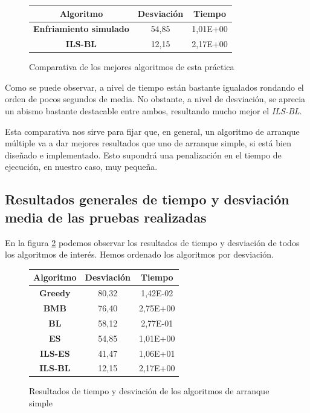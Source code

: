\begin{figure}[H]
    \centering
    \begin{tabular}{|c|c|c|}
        \hline
        Algoritmo & \textbf{Desviación} & \textbf{Tiempo}\\
        \hline
        \textbf{Enfriamiento simulado} & 54,85 & 1,01E+00\\
        \hline
        \textbf{ILS-BL} & 12,15 & 2,17E+00\\
        \hline
    \end{tabular}
    \caption{Comparativa de los mejores algoritmos de esta práctica}
    \label{tab:simYComp}
\end{figure}

Como se puede observar, a nivel de tiempo están bastante igualados rondando el orden de pocos segundos de media. No obstante, a nivel de desviación, se aprecia un abismo bastante destacable entre ambos, resultando mucho mejor el \textit{ILS-BL}.

Esta comparativa nos sirve para fijar que, en general, un algoritmo de arranque múltiple va a dar mejores resultados que uno de arranque simple, si está bien diseñado e implementado. Esto supondrá una penalización en el tiempo de ejecución, en nuestro caso, muy pequeña.

\subsection{Resultados generales de tiempo y desviación media de las pruebas realizadas}

En la figura \ref{tab:compTotal} podemos observar los resultados de tiempo y desviación de todos los algoritmos de interés. Hemos ordenado los algoritmos por desviación.

\begin{figure}[H]
    \centering
    \begin{tabular}{|c|c|c|}
        \hline
        Algoritmo & \textbf{Desviación} & \textbf{Tiempo}\\
        \hline
        \textbf{Greedy} & 80,32 & 1,42E-02\\
        \hline
        \textbf{BMB} & 76,40 & 2,75E+00\\
        \hline
        \textbf{BL} & 58,12 & 2,77E-01\\
        \hline
        \textbf{ES} & 54,85 & 1,01E+00\\
        \hline
        \textbf{ILS-ES} & 41,47 & 1,06E+01\\
        \hline
        \textbf{ILS-BL} & 12,15 & 2,17E+00\\
        \hline
    \end{tabular}
    \caption{Resultados de tiempo y desviación de los algoritmos de arranque simple}
    \label{tab:compTotal}
\end{figure}

